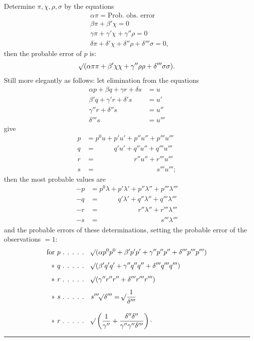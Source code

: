 Determine \(\pi,\chi,\rho,\sigma\) by the equations
\[
\begin{aligned}
&\alpha\pi=\text{Prob. obs. error}\\
&\beta\pi+\beta'\chi=0\\
&\gamma\pi+\gamma'\chi+\gamma''\rho=0\\
&\delta\pi+\delta'\chi+\delta''\rho+\delta'''\sigma=0,
\end{aligned}
\]
then the probable error of \(p\) is:
\[
\mathord{{}^{}\!\surd}(\alpha\pi\pi+\beta'\chi\chi+\gamma''\rho\rho+\delta'''\sigma\sigma).
\]
Still more elegantly as follows: let elimination from the equations
\[
\begin{aligned}
\alpha p+\beta q+\gamma r+\delta s&=u\\
\beta'q+\gamma'r+\delta's&=u'\\
\gamma''r+\delta''s&=u''\\
\delta'''s&=u'''
\end{aligned}
\]
give
\[
\begin{aligned}
p&=p^0u+p'u'+p''u''+p'''u'''\\
q&=\phantom{p^0u+{}}q'u'+q''u''+q'''u'''\\
r&=\phantom{p^0u+p'u'+{}}r''u''+r'''u'''\\
s&=\phantom{p^0u+p'u'+p''u''+{}}s'''u''';
\end{aligned}
\]
then the most probable values are
\[
\begin{aligned}
-p&=p^0\lambda+p'\lambda'+p''\lambda''+p'''\lambda'''\\
-q&=\phantom{p^0\lambda+{}}q'\lambda'+q''\lambda''+q'''\lambda'''\\
-r&=\phantom{p^0\lambda+p'\lambda'+{}}r''\lambda''+r'''\lambda'''\\
-s&=\phantom{p^0\lambda+p'\lambda'+p''\lambda''+{}}s'''\lambda'''
\end{aligned}
\]
and the probable errors of these determinations, setting the probable error of the observations \(=1\):
\[
\begin{aligned}
\text{for }p\;\text{. . . . .}\quad&\mathord{{}^{}\!\surd}(\alpha p^0p^0+\beta'p'p'+\gamma''p''p''+\delta'''p'''p''')\\[5pt]
\text{» }q\;\text{. . . . .}\quad&\mathord{{}^{}\!\surd}(\beta'q'q'+\gamma''q''q''+\delta'''q'''q''')\\[5pt]
\text{» }r\;\text{. . . . .}\quad&\mathord{{}^{}\!\surd}(\gamma''r''r''+\delta'''r'''r''')\\[5pt]
\text{» }s\;\text{. . . . .}\quad&s'''\mathord{{}^{}\!\surd}\delta'''=\mathord{{}^{}\!\surd}\frac{1}{\delta'''}\\[10pt]
\text{» }r\;\text{. . . . .}\quad&\mathord{{}^{}\!\surd}\left(\frac{1}{\gamma''}+\frac{\delta''\delta''}{\gamma''\gamma''\delta'''}\right)\mathpunct{\cdot}
\end{aligned}
\]
\begin{center}\rule{.18\textwidth}{.35pt}\end{center}

